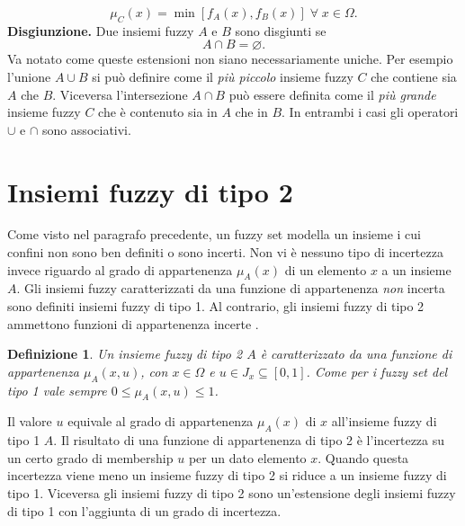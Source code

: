 \documentclass [11pt,a4paper,twoside,openright] {book}
\newtheorem{fuzzyset2}{Definizione}
\begin{document}
\begin{equation} \mu_C(x) = \min[f_A(x), f_B(x)] \; \forall \; x \in \Omega. \end{equation} 
\textbf{Disgiunzione.} Due insiemi fuzzy $A$ e $B$ sono disgiunti se
\begin{equation} A \cap B = \varnothing. \end{equation} 
Va notato come queste estensioni non siano necessariamente uniche. Per esempio l'unione $A \cup B$ si può definire come il \textit{più piccolo} insieme fuzzy $C$ che contiene sia $A$ che $B$. Viceversa l'intersezione $A \cap B$ può essere definita come il \textit{più grande} insieme fuzzy $C$ che è contenuto sia in $A$ che in $B$. In entrambi i casi gli operatori $\cup$ e $\cap$ sono associativi.
\section{Insiemi fuzzy di tipo 2}
Come visto nel paragrafo precedente, un fuzzy set modella un insieme i cui confini non sono ben definiti o sono incerti. Non vi è nessuno tipo di incertezza invece riguardo al grado di appartenenza $\mu_A(x)$ di un elemento $x$ a un insieme $A$. Gli insiemi fuzzy caratterizzati da una funzione di appartenenza \textit{non} incerta sono definiti insiemi fuzzy di tipo 1. Al contrario, gli insiemi fuzzy di tipo 2 ammettono funzioni di appartenenza incerte \cite{mendel2002type}.
\begin{fuzzyset2}
Un insieme fuzzy di tipo 2 $A$ è caratterizzato da una funzione di appartenenza $\mu_A(x,u)$, con $x \in \Omega$ e $u \in J_x \subseteq [0,1]$. Come per i fuzzy set del tipo 1 vale sempre $0 \leq \mu_A(x,u) \leq 1$.
\end{fuzzyset2}
Il valore $u$ equivale al grado di appartenenza $\mu_A(x)$ di $x$ all'insieme fuzzy di tipo 1 $A$. Il risultato di una funzione di appartenenza di tipo 2 è l'incertezza su un certo grado di membership $u$ per un dato elemento $x$. Quando questa incertezza viene meno un insieme fuzzy di tipo 2 si riduce a un insieme fuzzy di tipo 1. Viceversa gli insiemi fuzzy di tipo 2 sono un'estensione degli insiemi fuzzy di tipo 1 con l'aggiunta di un grado di incertezza.
\end{document}
